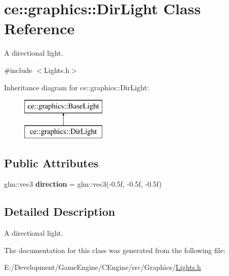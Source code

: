 \hypertarget{classce_1_1graphics_1_1_dir_light}{}\section{ce\+:\+:graphics\+:\+:Dir\+Light Class Reference}
\label{classce_1_1graphics_1_1_dir_light}


A directional light.  




{\ttfamily \#include $<$Lights.\+h$>$}

Inheritance diagram for ce\+:\+:graphics\+:\+:Dir\+Light\+:\begin{figure}[H]
\begin{center}
\leavevmode
\includegraphics[height=2.000000cm]{classce_1_1graphics_1_1_dir_light}
\end{center}
\end{figure}
\subsection*{Public Attributes}
\begin{DoxyCompactItemize}
\item 
\mbox{\label{classce_1_1graphics_1_1_dir_light_a5903f80742e62c8a0fc11499287ca770}} 
glm\+::vec3 {\bfseries direction} = glm\+::vec3(-\/0.\+5f, -\/0.\+5f, -\/0.\+5f)
\end{DoxyCompactItemize}


\subsection{Detailed Description}
A directional light. 

The documentation for this class was generated from the following file\+:\begin{DoxyCompactItemize}
\item 
E\+:/\+Development/\+Game\+Engine/\+C\+Engine/src/\+Graphics/\hyperlink{_lights_8h}{Lights.\+h}\end{DoxyCompactItemize}
